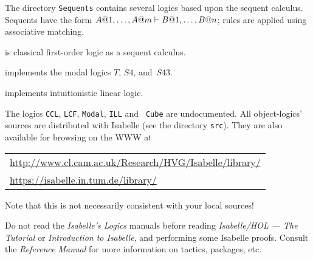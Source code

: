 The directory \texttt{Sequents} contains several logics based
  upon the sequent calculus.  Sequents have the form $A@1,\ldots,A@m\vdash
B@1,\ldots,B@n$; rules are applied using associative matching.
\begin{ttdescription}
\item[\thydx{LK}] is classical first-order logic as a sequent calculus.

\item[\thydx{Modal}] implements the modal logics $T$, $S4$, and~$S43$.  

\item[\thydx{ILL}] implements intuitionistic linear logic.
\end{ttdescription}

The logics \texttt{CCL}, \texttt{LCF}, \texttt{Modal}, \texttt{ILL} and {\tt
  Cube} are undocumented.  All object-logics' sources are distributed with
Isabelle (see the directory \texttt{src}).  They are also available for
browsing on the WWW at

\begin{center}\small
  \begin{tabular}{l}
    \url{http://www.cl.cam.ac.uk/Research/HVG/Isabelle/library/} \\
    \url{https://isabelle.in.tum.de/library/} \\
  \end{tabular}
\end{center}

Note that this is not necessarily consistent with your local sources!

\medskip Do not read the \emph{Isabelle's Logics} manuals before reading
\emph{Isabelle/HOL --- The Tutorial} or \emph{Introduction to Isabelle}, and
performing some Isabelle proofs.  Consult the {\em Reference Manual} for more
information on tactics, packages, etc.


